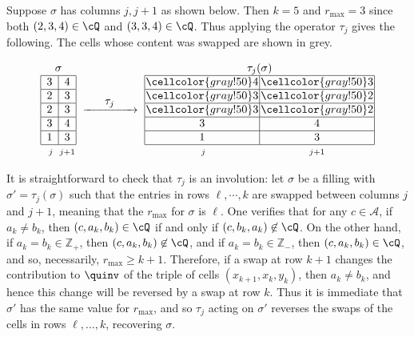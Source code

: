 \begin{example}\label{ex:tau}
Suppose $\sigma$ has columns $j,j+1$ as shown below. Then $k=5$ and $r_{\max}=3$ since both $(2,3,4)\in\cQ$ and $(3,3,4)\in\cQ$. Thus applying the operator $\tau_j$ gives the following. The cells whose content was swapped are shown in grey.


\begin{equation*}
\renewcommand{\arraystretch}{1}  
\setlength{\arraycolsep}{1pt} 
\begin{array}{|c|c|}
\multicolumn{2}{c}{\sigma}
\\
\hline
3 &  4\\
\hline
2 & 3  \\
\hline
2 & 3 \\
\hline
3 & 4\\
\hline
1 & 3 \\
\hline
\multicolumn{1}{c}{\scriptstyle \phantom{+} j\phantom{1}}&
\multicolumn{1}{c}{\scriptstyle j+1}
\end{array}
\,\,\xrightarrow{\makebox[1.5cm]{$\tau_j$}}\,\,
\begin{array}{|c|c|}
\multicolumn{2}{c}{\tau_j(\sigma)}
\\
\hline
\cellcolor{gray!50}4 & \cellcolor{gray!50} 3\\
\hline
\cellcolor{gray!50}3 & \cellcolor{gray!50}2  \\
\hline
\cellcolor{gray!50}3 & \cellcolor{gray!50}2 \\
\hline
3 & 4\\
\hline
1 & 3 \\
\hline
\multicolumn{1}{c}{\scriptstyle \phantom{+} j\phantom{1}}&
\multicolumn{1}{c}{\scriptstyle j+1}
\end{array}
\end{equation*}

\end{example}

It is straightforward to check that $\tau_j$ is an involution: let $\sigma$ be a filling with $\sigma'=\tau_j(\sigma)$ such that the entries in rows $\ell,\cdots,k$ are swapped between columns $j$ and $j+1$, meaning that the $r_{\max}$ for $\sigma$ is $\ell$. One verifies that for any $c\in\mathcal{A}$, if $a_k\neq b_k$, then $(c,a_{k},b_{k})\in\cQ$ if and only if $(c,b_k,a_k)\not\in\cQ$. On the other hand, if $a_k= b_k\in\mathbb{Z}_+$, then $(c,a_{k},b_{k}) \not\in\cQ$, and if $a_k= b_k\in\mathbb{Z}_-$, then $(c,a_{k},b_{k})\in\cQ$, and so, necessarily, $r_{\max}\geq k+1$. Therefore, if a swap at row $k+1$ changes the contribution to $\quinv$ of the triple of cells $(x_{k+1},x_k,y_k)$, then $a_k\neq b_k$, and hence this change will be reversed by a swap at row $k$. Thus it is immediate that $\sigma'$ has the same value for $r_{\max}$, and so $\tau_j$ acting on $\sigma'$ reverses the swaps of the cells in rows $\ell,\dots,k$, recovering $\sigma$. 



